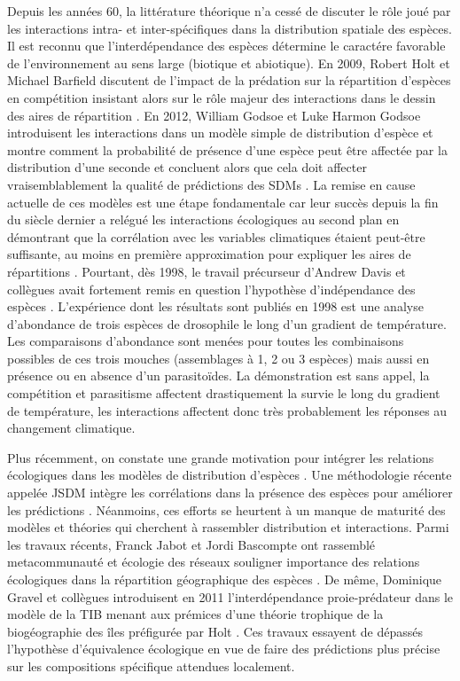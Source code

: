 Depuis les années 60, la littérature théorique n'a cessé de discuter le
rôle joué par les interactions intra- et inter-spécifiques dans la
distribution spatiale des espèces. Il est reconnu que l'interdépendance
des espèces détermine le caractére favorable de l'environnement au sens
large (biotique et abiotique). En 2009, Robert Holt et Michael Barfield
discutent de l'impact de la prédation sur la répartition d'espèces en
compétition insistant alors sur le rôle majeur des interactions dans le
dessin des aires de répartition \citep{Holt2009}. En 2012, William
Godsoe et Luke Harmon Godsoe introduisent les interactions dans un
modèle simple de distribution d'espèce et montre comment la probabilité
de présence d'une espèce peut être affectée par la distribution d'une
seconde et concluent alors que cela doit affecter vraisemblablement la
qualité de prédictions des SDMs \citep{Godsoe2012}. La remise en cause
actuelle de ces modèles est une étape fondamentale car leur succès
depuis la fin du siècle dernier a relégué les interactions écologiques
au second plan en démontrant que la corrélation avec les variables
climatiques étaient peut-être suffisante, au moins en première
approximation pour expliquer les aires de répartitions
\citep{Pearson2003}. Pourtant, dès 1998, le travail précurseur d'Andrew
Davis et collègues \citep{Davis1998} avait fortement remis en question
l'hypothèse d'indépendance des espèces \citep{Jeschke2008}. L'expérience
dont les résultats sont publiés en 1998 est une analyse d'abondance de
trois espèces de drosophile le long d'un gradient de température. Les
comparaisons d'abondance sont menées pour toutes les combinaisons
possibles de ces trois mouches (assemblages à 1, 2 ou 3 espèces) mais
aussi en présence ou en absence d'un parasitoïdes. La démonstration est
sans appel, la compétition et parasitisme affectent drastiquement la
survie le long du gradient de température, les interactions affectent
donc très probablement les réponses au changement climatique.

Plus récemment, on constate une grande motivation pour intégrer les
relations écologiques dans les modèles de distribution d'espèces
\citep{Kissling2012, Guisan2011}. Une méthodologie récente appelée JSDM
intègre les corrélations dans la présence des espèces pour améliorer les
prédictions \citep{Pollock2014}. Néanmoins, ces efforts se heurtent à un
manque de maturité des modèles et théories qui cherchent à rassembler
distribution et interactions. Parmi les travaux récents, Franck Jabot et
Jordi Bascompte ont rassemblé metacommunauté et écologie des réseaux
souligner importance des relations écologiques dans la répartition
géographique des espèces \citep{Jabot2012}. De même, Dominique Gravel et
collègues introduisent en 2011 l'interdépendance proie-prédateur dans le
modèle de la TIB menant aux prémices d'une théorie trophique de la
biogéographie des îles \citep{Gravel2011} préfigurée par Holt
\citep{Holt2009a}. Ces travaux essayent de dépassés l'hypothèse
d'équivalence écologique en vue de faire des prédictions plus précise
sur les compositions spécifique attendues localement.

